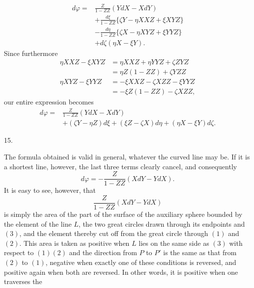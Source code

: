 %
\[
\begin{aligned}
d\varphi={}&\frac{Z}{1-ZZ}(YdX-XdY)\\
&+\frac{d\xi}{1-ZZ}\{\zeta Y-\eta XXZ+\xi XYZ\}\\
&-\frac{d\eta}{1-ZZ}\{\zeta X-\eta XYZ+\xi YYZ\}\\
&+d\zeta(\eta X-\xi Y).
\end{aligned}
\]
Since furthermore
\[
\begin{aligned}
\eta XXZ-\xi XYZ&=\eta XXZ+\eta YYZ+\zeta ZYZ\\
&=\eta Z(1-ZZ)+\zeta YZZ\\
\eta XYZ-\xi YYZ&=-\xi XXZ-\zeta XZZ-\xi YYZ\\
&=-\xi Z(1-ZZ)-\zeta XZZ,
\end{aligned}
\]
our entire expression becomes
\[
\begin{aligned}
d\varphi={}&\frac{Z}{1-ZZ}(YdX-XdY)\\
&+(\zeta Y-\eta Z)d\xi+(\xi Z-\zeta X)d\eta+(\eta X-\xi Y)d\zeta.
\end{aligned}
\]

\begin{center}15.\end{center}
\noindent\hspace*{1.2em}The formula obtained is valid in general, whatever the curved line may be. If it is a shortest line, however, the last three terms clearly cancel, and consequently
\[
d\varphi=-\frac{Z}{1-ZZ}(XdY-YdX).
\]
It is easy to see, however, that
\[
\frac{Z}{1-ZZ}(XdY-YdX)
\]
is simply the area of the part of the surface of the auxiliary sphere bounded by the element of the line $L$, the two great circles drawn through its endpoints and $(3)$, and the element thereby cut off from the great circle through $(1)$ and $(2)$. This area is taken as positive when $L$ lies on the same side as $(3)$ with respect to $(1)(2)$ and the direction from $P$ to $P'$ is the same as that from $(2)$ to $(1)$, negative when exactly one of these conditions is reversed, and positive again when both are reversed. In other words, it is positive when one traverses the
